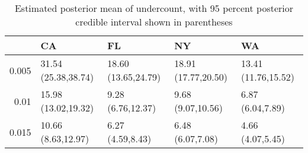 \begin{table}[ht]
\centering
\begingroup\footnotesize
\begin{tabular}{rllll}
  \hline
 & CA & FL & NY & WA \\ 
  \hline
0.005 & 31.54 (25.38,38.74) & 18.60 (13.65,24.79) & 18.91 (17.77,20.50) & 13.41 (11.76,15.52) \\ 
  0.01 & 15.98 (13.02,19.32) & 9.28 (6.76,12.37) & 9.68 (9.07,10.56) & 6.87 (6.04,7.89) \\ 
  0.015 & 10.66 (8.63,12.97) & 6.27 (4.59,8.43) & 6.48 (6.07,7.08) & 4.66 (4.07,5.45) \\ 
   \hline
\end{tabular}
\endgroup
\caption{Estimated posterior mean of undercount, with 95 percent posterior credible interval shown in parentheses 
             \label{tab:undercount}} 
\end{table}
